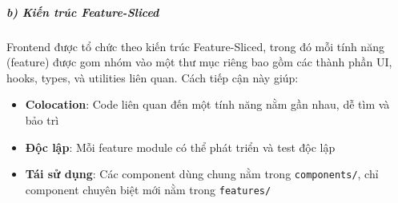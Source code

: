 \documentclass[13pt,a4paper]{extarticle}
\renewcommand{\\}{\thesislongtableorignewline\hline}%
\providecommand{\tightlist}{%
  \setlength{\itemsep}{0pt}\setlength{\parskip}{0pt}}
\begin{document}
\subparagraph{b) Kiến trúc
Feature-Sliced}\label{b-kiux1ebfn-truxfac-feature-sliced}

Frontend được tổ chức theo kiến trúc Feature-Sliced, trong đó mỗi tính
năng (feature) được gom nhóm vào một thư mục riêng bao gồm các thành
phần UI, hooks, types, và utilities liên quan. Cách tiếp cận này giúp:

\begin{itemize}
\tightlist
\item
  \textbf{Colocation}: Code liên quan đến một tính năng nằm gần nhau, dễ
  tìm và bảo trì
\item
  \textbf{Độc lập}: Mỗi feature module có thể phát triển và test độc lập
\item
  \textbf{Tái sử dụng}: Các component dùng chung nằm trong
  \texttt{components/}, chỉ component chuyên biệt mới nằm trong
  \texttt{features/}
\end{itemize}
\end{document}

